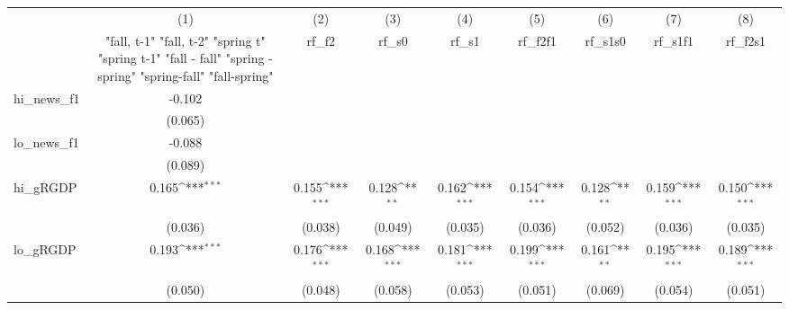 {
\def\sym#1{\ifmmode^{#1}\else\(^{#1}\)\fi}
\begin{tabular}{l*{8}{c}}
\toprule
            &\multicolumn{1}{c}{(1)}&\multicolumn{1}{c}{(2)}&\multicolumn{1}{c}{(3)}&\multicolumn{1}{c}{(4)}&\multicolumn{1}{c}{(5)}&\multicolumn{1}{c}{(6)}&\multicolumn{1}{c}{(7)}&\multicolumn{1}{c}{(8)}\\
            &\multicolumn{1}{c}{  "fall, t-1" "fall, t-2" "spring t" "spring t-1"  "fall - fall" "spring - spring" "spring-fall" "fall-spring" }&\multicolumn{1}{c}{rf\_f2}&\multicolumn{1}{c}{rf\_s0}&\multicolumn{1}{c}{rf\_s1}&\multicolumn{1}{c}{rf\_f2f1}&\multicolumn{1}{c}{rf\_s1s0}&\multicolumn{1}{c}{rf\_s1f1}&\multicolumn{1}{c}{rf\_f2s1}\\
\midrule
hi\_news\_f1  &      -0.102         &                     &                     &                     &                     &                     &                     &                     \\
            &     (0.065)         &                     &                     &                     &                     &                     &                     &                     \\
\addlinespace
lo\_news\_f1  &      -0.088         &                     &                     &                     &                     &                     &                     &                     \\
            &     (0.089)         &                     &                     &                     &                     &                     &                     &                     \\
\addlinespace
hi\_gRGDP    &       0.165\sym{***}&       0.155\sym{***}&       0.128\sym{**} &       0.162\sym{***}&       0.154\sym{***}&       0.128\sym{**} &       0.159\sym{***}&       0.150\sym{***}\\
            &     (0.036)         &     (0.038)         &     (0.049)         &     (0.035)         &     (0.036)         &     (0.052)         &     (0.036)         &     (0.035)         \\
\addlinespace
lo\_gRGDP    &       0.193\sym{***}&       0.176\sym{***}&       0.168\sym{***}&       0.181\sym{***}&       0.199\sym{***}&       0.161\sym{**} &       0.195\sym{***}&       0.189\sym{***}\\
            &     (0.050)         &     (0.048)         &     (0.058)         &     (0.053)         &     (0.051)         &     (0.069)         &     (0.054)         &     (0.051)         \\

\end{tabular}}
